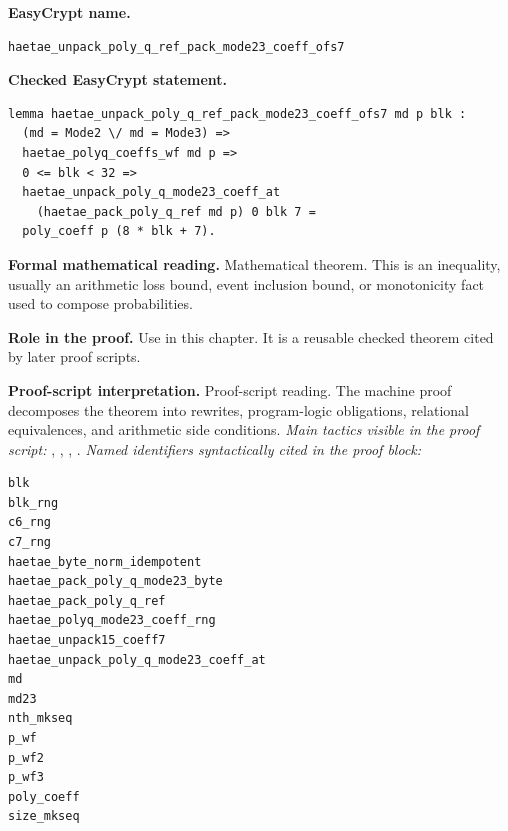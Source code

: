 \begin{formaltheorem}
\noindent\textbf{EasyCrypt name.}
\begin{lstlisting}[language=EasyCrypt,basicstyle=\ttfamily\scriptsize]
haetae_unpack_poly_q_ref_pack_mode23_coeff_ofs7
\end{lstlisting}
\noindent\textbf{Checked EasyCrypt statement.}
\begin{lstlisting}[language=EasyCrypt,basicstyle=\ttfamily\scriptsize]
lemma haetae_unpack_poly_q_ref_pack_mode23_coeff_ofs7 md p blk :
  (md = Mode2 \/ md = Mode3) =>
  haetae_polyq_coeffs_wf md p =>
  0 <= blk < 32 =>
  haetae_unpack_poly_q_mode23_coeff_at
    (haetae_pack_poly_q_ref md p) 0 blk 7 =
  poly_coeff p (8 * blk + 7).
\end{lstlisting}
\noindent\textbf{Formal mathematical reading.}
Mathematical theorem. This is an inequality, usually an arithmetic loss bound, event inclusion bound, or monotonicity fact used to compose probabilities.

\noindent\textbf{Role in the proof.}
Use in this chapter. It is a reusable checked theorem cited by later proof scripts.

\noindent\textbf{Proof-script interpretation.}
Proof-script reading. The machine proof decomposes the theorem into rewrites, program-logic obligations, relational equivalences, and arithmetic side conditions.
\emph{Main tactics visible in the proof script:} , , , .
\emph{Named identifiers syntactically cited in the proof block:}
\begin{lstlisting}[language=EasyCrypt,basicstyle=\ttfamily\scriptsize]
blk
blk_rng
c6_rng
c7_rng
haetae_byte_norm_idempotent
haetae_pack_poly_q_mode23_byte
haetae_pack_poly_q_ref
haetae_polyq_mode23_coeff_rng
haetae_unpack15_coeff7
haetae_unpack_poly_q_mode23_coeff_at
md
md23
nth_mkseq
p_wf
p_wf2
p_wf3
poly_coeff
size_mkseq
\end{lstlisting}

\end{formaltheorem}

